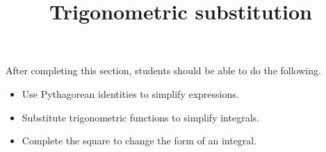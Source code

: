 \documentclass{ximera}
\title{Trigonometric substitution}
\begin{document}
\begin{abstract}
\end{abstract}

\maketitle

\begin{sectionOutcomes}

After completing this section, students should be able to do the following.

\begin{itemize}
\item Use Pythagorean identities to simplify expressions.
\item Substitute trigonometric functions to simplify integrals.
\item Complete the square to change the form of an integral.
\end{itemize}

\end{sectionOutcomes}
\end{document}
